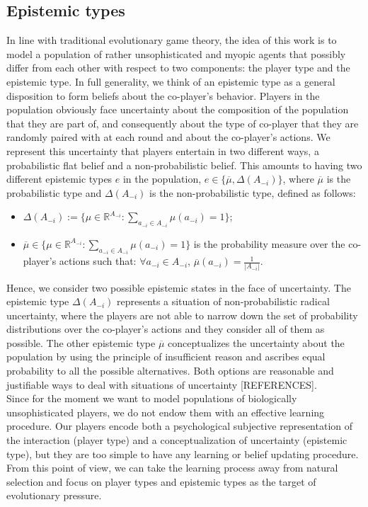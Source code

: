 \documentclass[fleqn,reqno,11pt]{article}
\begin{document}
\fi


\subsection{Epistemic types}

In line with traditional evolutionary game theory, the idea of this work is to model a population of rather unsophisticated and myopic agents that possibly differ from each other with respect to two components: the player type and the epistemic type.
In full generality, we think of an epistemic type as a general disposition to form beliefs about the co-player’s behavior.    Players in the population obviously face uncertainty about the composition of the population that they are part of, and consequently about the type of co-player that they are randomly paired with at each round and about the co-player's actions. We represent this uncertainty that players entertain in two different ways, a probabilistic flat belief and a non-probabilistic belief. This amounts to having two different epistemic types $e$ in the population, $e \in \lbrace \overline{\mu}, \Delta(A_{-i}) \rbrace $, where $\overline{\mu}$ is the probabilistic type and $\Delta(A_{-i})$ is the non-probabilistic type, defined as follows:

\begin{itemize}

\item $ \Delta(A_{-i}):=\lbrace \mu \in \mathbb{R}^{A_{-i}}: \sum_{a_{-i} \in A_{-i}} \mu(a_{-i}) = 1 \rbrace$;

\item $\overline{\mu} \in \lbrace \mu \in \mathbb{R}^{A_{-i}}: \sum_{a_{-i} \in A_{-i}} \mu(a_{-i}) = 1 \rbrace$ is the probability measure over the co-player's actions such that: $\forall a_{-i} \in A_{-i}$, $\overline{\mu}(a_{-i})= \frac{1}{|A_{-i}|}$.

\end{itemize} 

Hence, we consider two possible epistemic states in the face of uncertainty. The epistemic type $\Delta(A_{-i})$ represents a situation of non-probabilistic radical uncertainty, where the players are not able to narrow down the set of probability distributions over the co-player's actions and they consider all of them as possible. The other epistemic type $\overline{\mu}$ conceptualizes the uncertainty about the population by using the principle of insufficient reason and ascribes equal probability to all the possible alternatives. Both options are reasonable and justifiable ways to deal with situations of uncertainty [REFERENCES]. \\
Since for the moment we want to model populations of biologically unsophisticated players, we do not endow them with an effective learning procedure. Our players encode both a psychological subjective representation of the interaction (player type) and a conceptualization of uncertainty (epistemic type), but they are too simple to have any learning or belief updating procedure. From this point of view, we can take the learning process away from natural selection and focus on player types and epistemic types as the target of evolutionary pressure.
\end{document}
